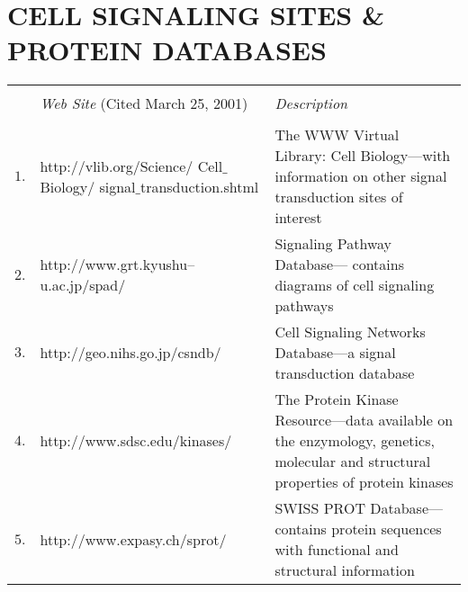 \chapter{CELL SIGNALING SITES \& PROTEIN DATABASES}
\label{APP:A}
\vspace{0.5in}
\renewcommand{\baselinestretch}{0.8}
{\ssp
\begin{center}
	\begin{tabular}
	{|p{0.2in}|
	p{2.5in}|
	p{2.7in}|} \hline 
		\rule{0pt}{1pt} & & \\
			~ & 
			\PBS\raggedright{{\em Web Site} (Cited March 25, 2001)} & 
			\PBS\raggedright{\em Description}  \vspace{1mm} \\ \hline
		\rule{0pt}{1pt} & & \\ 
			$1.$ & 
			\PBS\raggedright{http://vlib.org/Science/ Cell$\_$Biology/ signal$\_$transduction.shtml} &
			\PBS\raggedright{The WWW Virtual Library: Cell Biology---with 
				information on other signal transduction sites of interest} \vspace{1mm}\\
			$2.$ &
			\PBS\raggedright{http://www.grt.kyushu--u.ac.jp/spad/}  &
			\PBS\raggedright{Signaling Pathway Database--- contains diagrams of cell signaling pathways}  \vspace{1mm} \\
			$3.$ &
			\PBS\raggedright{http://geo.nihs.go.jp/csndb/} &  
			\PBS\raggedright{Cell Signaling Networks Database---a signal transduction database \cite{CSND:1999}} \vspace{1mm} \\
			$4.$ &
			\PBS\raggedright{http://www.sdsc.edu/kinases/} &
			\PBS\raggedright{The Protein Kinase Resource---data available on the enzymology, 
				genetics, molecular and structural properties of protein kinases \cite{PKR:1997}} \vspace{1mm}\\
			$5.$ &
			\PBS\raggedright{http://www.expasy.ch/sprot/}  & 
			\PBS\raggedright{SWISS PROT Database---contains protein 
				sequences with functional and structural information \cite{BAIROCH:2000}} \vspace{1mm} \\

\end{tabular}
\end{center}}
